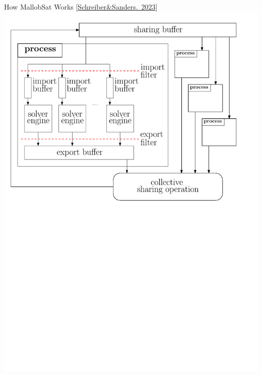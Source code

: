 \documentclass[]{sdqbeamer}
\begin{document}
\begin{frame}{How MallobSat Works [\href{https://www.jair.org/index.php/jair/article/download/15827/27072}{Schreiber\&Sanders.~2023}]}
    \center
    \includegraphics[scale=.8]{figures/mallob_architecture.pdf}
\end{frame}
\end{document}
